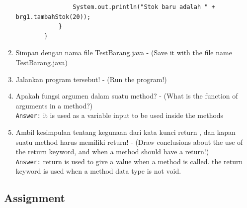\documentclass[12pt,titlepage]{article}
\begin{document}
\begin{enumerate}
\begin{verbatim}
                System.out.println("Stok baru adalah " + brg1.tambahStok(20));
            }
        }
    \end{verbatim}
    \item Simpan dengan nama file TestBarang.java - (Save it with the file name TestBarang.java)
    \item Jalankan program tersebut! - (Run the program!)
    \item Apakah fungsi argumen dalam suatu method? - (What is the function of arguments in a method?) \\
    \texttt{Answer:} it is used as a variable input to be used inside the methods
    \item Ambil kesimpulan tentang kegunaan dari kata kunci return , dan kapan suatu method harus memiliki return! - (Draw conclusions about the use of the return keyword, and when a method should have a return!) \\
    \texttt{Answer:} return is used to give a value when a method is called. the return keyword is used when a method data type is not void.
\end{enumerate}

\subsection{Assignment}
\end{document}
